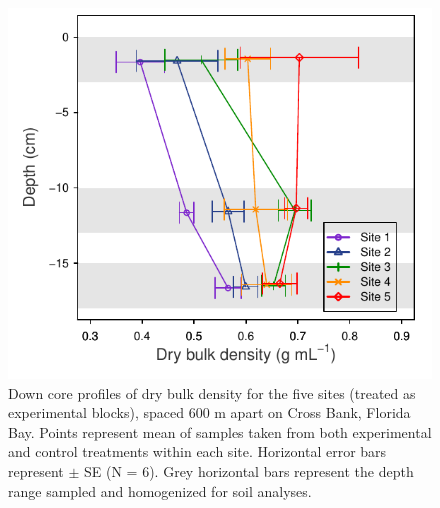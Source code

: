 \begin{figure}
  \centering
  \includegraphics[width=.95\textwidth]{Figures/chapter1/fig2}
\caption[Down core profiles of dry bulk density for the five sites]{Down core profiles of dry bulk density for the five sites (treated as experimental blocks), spaced 600 m apart on Cross Bank, Florida Bay. Points represent mean of samples taken from both experimental and control treatments within each site. Horizontal error bars represent $\pm$ SE (N = 6). Grey horizontal bars represent the depth range sampled and homogenized for soil analyses.}
  \label{fig:1fig2}
\end{figure}

